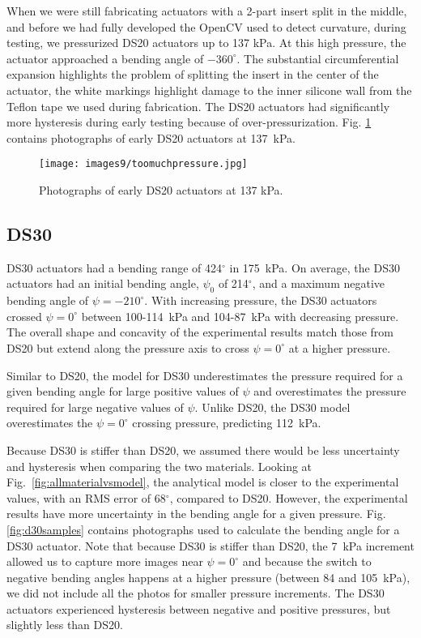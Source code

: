 When we were still fabricating actuators with a 2-part insert split in the middle, and before we had fully developed the OpenCV used to detect curvature, during testing, we pressurized DS20 actuators up to 137 kPa. At this high pressure, the actuator approached a bending angle of $-360^\circ$. The substantial circumferential expansion highlights the problem of splitting the insert in the center of the actuator, the white markings highlight damage to the inner silicone wall from the Teflon tape we used during fabrication. The DS20 actuators had significantly more hysteresis during early testing because of over-pressurization. Fig. \ref{fig:toomuchpressure} contains photographs of early DS20 actuators at 137~kPa. 
\\
\begin{figure}[ht]
    \centering
     \texttt{[image: images9/toomuchpressure.jpg]}
    \caption{Photographs of early DS20 actuators at 137 kPa.}
    \label{fig:toomuchpressure}
\end{figure}

\clearpage
\subsection{DS30}

DS30 actuators had a bending range of 424$^\circ$ in 175~kPa. On average, the DS30 actuators had an initial bending angle, $\psi_0$ of 214$^\circ$, and a maximum negative bending angle of $\psi=-210^\circ$. With increasing pressure, the DS30 actuators crossed $\psi=0^\circ$ between 100-114~kPa and 104-87~kPa with decreasing pressure. The overall shape and concavity of the experimental results match those from DS20 but extend along the pressure axis to cross $\psi=0^\circ$ at a higher pressure. 

Similar to DS20, the model for DS30 underestimates the pressure required for a given bending angle for large positive values of $\psi$ and overestimates the pressure required for large negative values of $\psi$. Unlike DS20, the DS30 model overestimates the $\psi=0^\circ$ crossing pressure, predicting 112~kPa. 

Because DS30 is stiffer than DS20, we assumed there would be less uncertainty and hysteresis when comparing the two materials. Looking at Fig.~\ref{fig:allmaterialvsmodel}, the analytical model is closer to the experimental values, with an RMS error of 68$^\circ$, compared to DS20. However, the experimental results have more uncertainty in the bending angle for a given pressure. Fig. \ref{fig:d30samples} contains photographs used to calculate the bending angle for a DS30 actuator. Note that because DS30 is stiffer than DS20, the 7~kPa increment allowed us to capture more images near $\psi=0^\circ$ and because the switch to negative bending angles happens at a higher pressure (between 84 and 105~kPa), we did not include all the photos for smaller pressure increments. The DS30 actuators experienced hysteresis between negative and positive pressures, but slightly less than DS20. 

